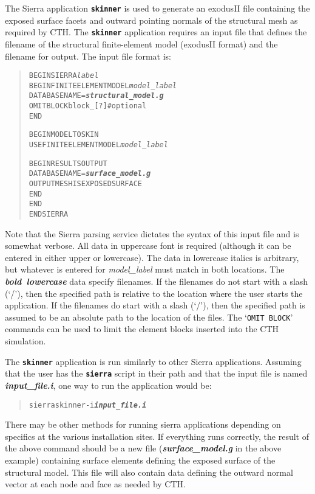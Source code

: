 \documentclass[11pt,twoside]{article}
\newcommand{\cmd}[1]
   {\mbox{\tt #1}\null}
\newcommand{\code}[1]
   {\mbox{\bf\tt #1}\null}
\newcommand{\file}[1]
   {\mbox{\bf\em #1}\null}
\newenvironment{source}
{\small\begin{quote}\begin{alltt}}
{\end{alltt}\end{quote}\normalsize}
\begin{document}
The Sierra application \code{skinner} is used to generate an exodusII
file containing the exposed surface facets and outward pointing normals
of the structural mesh as required by CTH.  The \code{skinner}
application requires an input file that defines the filename of the
structural finite{}-element model (exodusII format) and the filename
for output.  The input file format is:
\begin{source}
BEGIN SIERRA \textit{label}
BEGIN FINITE ELEMENT MODEL \textit{model\_label}
  DATABASE NAME = \file{structural\_model.g}
  OMIT BLOCK block\_[?]      # optional
 END

 BEGIN MODEL TO SKIN
  USE FINITE ELEMENT MODEL \textit{model\_label}

  BEGIN RESULTS OUTPUT
    DATABASE NAME = \file{surface\_model.g}
    OUTPUT MESH IS EXPOSED SURFACE
  END
END
END SIERRA
\end{source}
Note that the Sierra parsing service dictates the syntax of this input
file and is somewhat verbose.  All data in uppercase font is required
(although it can be entered in either upper or lowercase).  The data
in lowercase italics is arbitrary, but whatever is entered for
\textit{model\_label} must match in both locations.  The \file{bold
lowercase} data specify filenames.  If the filenames do not start with
a slash (`/'), then the specified path is relative to the location
where the user starts the application. If the filenames do start with a
slash (`/'), then the specified path is assumed to be an absolute path
to the location of the files.  The `\cmd{OMIT BLOCK}' commands can
be used to limit the element blocks inserted into the CTH simulation.


The \code{skinner} application is run similarly to other Sierra
applications.  Assuming that the user has the \code{sierra} script in their
path and that the input file is named \file{input\_file.i}, one way to
run the application would be:
\begin{source}
sierra skinner {-}i \file{input\_file.i}
\end{source}
There may be other methods for running sierra applications depending on
specifics at the various installation sites.  If everything runs
correctly, the result of the above command should be a new file
(\file{surface\_model.g} in the above example) containing surface
elements defining the exposed surface of the structural model. This
file will also contain data defining the outward normal vector at each
node and face as needed by CTH.
\end{document}
